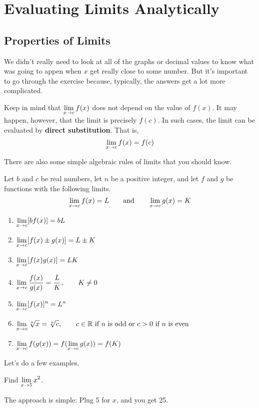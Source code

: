 \chapter{Evaluating Limits Analytically}
\section{Properties of Limits}
We didn't really need to look at all of the graphs or decimal values to know what was going to appen when $x$ get really close to some number. But it's important to go through the exercise because, typically, the answers get a lot more complicated. 

Keep in mind that $\displaystyle\lim\limits_{x\to c}f(x)$ does not depend on the value of $f(x)$. It may happen, however, that the limit is precisely $f(c)$. In such cases, the limit can be evaluated by \textbf{direct substitution}. That is,
$$\displaystyle\lim\limits_{x\to c}f(x)=f(c)$$

There are also some simple algebraic rules of limits that you should know.

\begin{theorem}
    Let $b$ and $c$ be real numbers, let $n$ be a positive integer, and let $f$ and $g$ be functions with the following limits.
    $$\displaystyle\lim\limits_{x\to c} f(x)=L\qquad \text{and} \qquad \displaystyle\lim\limits_{x\to c}g(x)=K$$
    \begin{enumerate}
        \item $\displaystyle\lim\limits_{x\to c}[bf(x)]=bL$
        \item $\displaystyle\lim\limits_{x\to c}[f(x)\pm g(x)]=L\pm K$
        \item $\displaystyle\lim\limits_{x\to c}[f(x)g(x)]=LK$
        \item $\displaystyle\lim\limits_{x\to c}\dfrac{f(x)}{g(x)}=\dfrac{L}{K},\qquad K\neq 0$
        \item $\displaystyle\lim\limits_{x\to c}[f(x)]^n=L^n$
        \item $\displaystyle\lim\limits_{x\to c}\sqrt[n]{x}=\sqrt[n]{c},\qquad c\in \mathbb{R}\text{ if $n$ is odd or $c>0$ if $n$ is even}$
        \item $\displaystyle\lim\limits_{x\to c}f(g(x))=f(\displaystyle\lim\limits_{x\to c}g(x))=f(K)$
    \end{enumerate}
    \label{theorem:limit-laws}
    \cite{ci}
\end{theorem}
\clearpage
Let's do a few examples.

\begin{example}
    Find $\displaystyle\lim\limits_{x\to 5}x^2$.
    \begin{solution}
        The approach is simple: Plug 5 for $x$, and you get 25.
    \end{solution}
\end{example}

